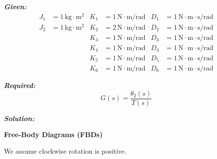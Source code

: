 \documentclass[11pt]{article}
\begin{document}
\vspace{12pt}

\noindent\textbf{\textit{Given:}}
\[
\begin{aligned}
J_1 &= 1\, \text{kg}\cdot\text{m}^2 & K_1 &= 1\, \text{N}\cdot\text{m/rad} & D_1 &= 1\, \text{N}\cdot\text{m}\cdot\text{s/rad} \\
J_2 &= 1\, \text{kg}\cdot\text{m}^2 & K_2 &= 2\, \text{N}\cdot\text{m/rad} & D_2 &= 1\, \text{N}\cdot\text{m}\cdot\text{s/rad} \\
& & K_3 &= 1\, \text{N}\cdot\text{m/rad} & D_3 &= 1\, \text{N}\cdot\text{m}\cdot\text{s/rad} \\
& & K_4 &= 1\, \text{N}\cdot\text{m/rad} & D_4 &= 1\, \text{N}\cdot\text{m}\cdot\text{s/rad} \\
& & K_5 &= 1\, \text{N}\cdot\text{m/rad} & D_5 &= 1\, \text{N}\cdot\text{m}\cdot\text{s/rad} \\
& & K_6 &= 1\, \text{N}\cdot\text{m/rad} & D_6 &= 1\, \text{N}\cdot\text{m}\cdot\text{s/rad}
\end{aligned}
\]

\vspace{12pt}

\noindent \textbf{\textit{Required:}}
\[
G(s) = \frac{\theta_2(s)}{T(s)}
\]

\vspace{12pt}

\noindent\textbf{\textit{Solution:}}

\vspace{12pt}

\noindent\textbf{Free-Body Diagrams (FBDs)}

\vspace{12pt}

We assume clockwise rotation is positive.
\end{document}
